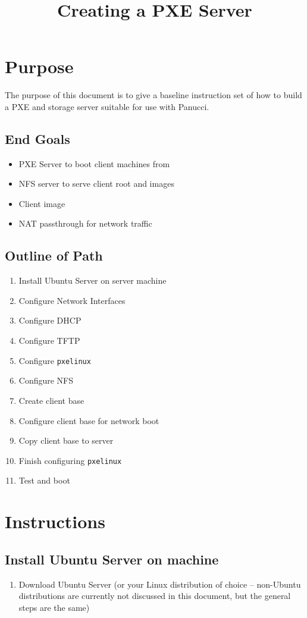 \documentclass{article}
\begin{document}
\title{Creating a PXE Server}
\maketitle
\begin{flushleft}
  \pagebreak
\section{Purpose}
The purpose of this document is to give a baseline instruction set of how to build a PXE and storage server suitable for use with Panucci.
\subsection{End Goals}
\begin{itemize}
  \item PXE Server to boot client machines from
  \item NFS server to serve client root and images
  \item Client image
  \item NAT passthrough for network traffic
\end{itemize}
\subsection{Outline of Path}
\begin{enumerate}
  \item Install Ubuntu Server on server machine
  \item Configure Network Interfaces
  \item Configure DHCP
  \item Configure TFTP
  \item Configure \verb|pxelinux|
  \item Configure NFS
  \item Create client base
  \item Configure client base for network boot
  \item Copy client base to server
  \item Finish configuring \verb|pxelinux|
  \item Test and boot
\end{enumerate}
\pagebreak
\section{Instructions}
\subsection{Install Ubuntu Server on machine}
\begin{enumerate}
  \item Download Ubuntu Server (or your Linux distribution of choice -- non-Ubuntu distributions are currently not discussed in this document, but the general steps are the same)


\end{enumerate}
\end{flushleft}
\end{document}
